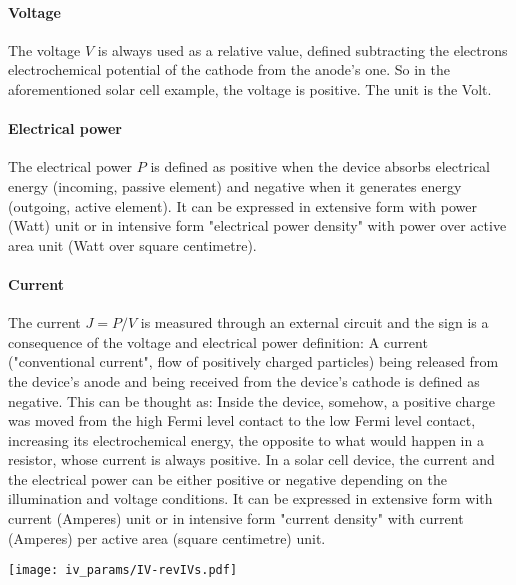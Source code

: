 		\paragraph{Voltage} The voltage $V$ is always used as a relative value, defined subtracting the electrons electrochemical potential of the cathode from the anode's one.
		So in the aforementioned solar cell example, the voltage is positive.
		The unit is the Volt.

		\paragraph{Electrical power} The electrical power $P$ is defined as positive when the device absorbs electrical energy (incoming, passive element) and negative when it generates energy (outgoing, active element).
		It can be expressed in extensive form with power (Watt) unit or in intensive form "electrical power density" with power over active area unit (Watt over square centimetre).

		\paragraph{Current} The current $J=P/V$ is measured through an external circuit and the sign is a consequence of the voltage and electrical power definition: A current ("conventional current", flow of positively charged particles) being released from the device's anode and being received from the device's cathode is defined as negative.
		This can be thought as: Inside the device, somehow, a positive charge was moved from the high Fermi level contact to the low Fermi level contact, increasing its electrochemical energy, the opposite to what would happen in a resistor, whose current is always positive.
		In a solar cell device, the current and the electrical power can be either positive or negative depending on the illumination and voltage conditions.
		It can be expressed in extensive form with current (Amperes) unit or in intensive form "current density" with current (Amperes) per active area (square centimetre) unit.

		\begin{SCfigure}
			\centering
			\texttt{[image: iv\_params/IV-revIVs.pdf]}
			\label{fig:iv_params}
		\end{SCfigure}

